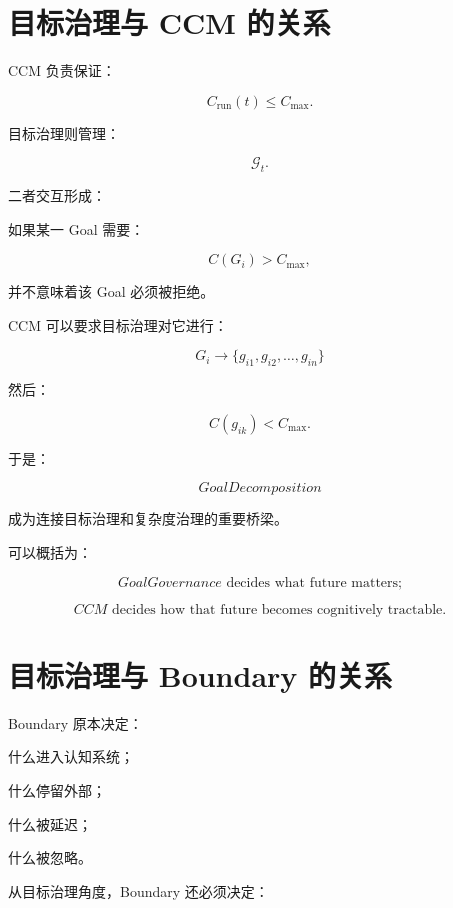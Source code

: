 \section{目标治理与 CCM 的关系}

CCM 负责保证：

\[
C_{\mathrm{run}}(t)
\le
C_{\max}.
\]

目标治理则管理：

\[
\mathcal G_t.
\]

二者交互形成：

\begin{statementbox}
\centering
{}
\end{statementbox}

如果某一 Goal 需要：

\[
C(G_i)
>
C_{\max},
\]

并不意味着该 Goal 必须被拒绝。

CCM 可以要求目标治理对它进行：

\[
G_i
\rightarrow
\{g_{i1},g_{i2},\dots,g_{in}\}
\]

然后：

\[
C(g_{ik})
<
C_{\max}.
\]

于是：

\[
\boxed{
GoalDecomposition
}
\]

成为连接目标治理和复杂度治理的重要桥梁。

可以概括为：

\[
\boxed{
GoalGovernance
\text{ decides what future matters;}
}
\]

\[
\boxed{
CCM
\text{ decides how that future becomes cognitively tractable.}
}
\]


\section{目标治理与 Boundary 的关系}

Boundary 原本决定：

什么进入认知系统；

什么停留外部；

什么被延迟；

什么被忽略。

从目标治理角度，Boundary 还必须决定：

\begin{statementbox}
\centering
{}
\end{statementbox}

